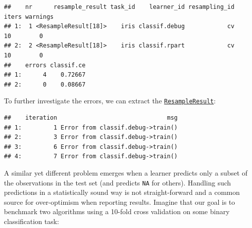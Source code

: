 \documentclass[]{scrbook}
\newenvironment{Shaded}{\begin{snugshade}}{\end{snugshade}}
\newcommand{\DataTypeTok}[1]{\textcolor[rgb]{0.13,0.29,0.53}{#1}}
\newcommand{\FloatTok}[1]{\textcolor[rgb]{0.00,0.00,0.81}{#1}}
\newcommand{\KeywordTok}[1]{\textcolor[rgb]{0.13,0.29,0.53}{\textbf{#1}}}
\newcommand{\NormalTok}[1]{#1}
\newcommand{\OperatorTok}[1]{\textcolor[rgb]{0.81,0.36,0.00}{\textbf{#1}}}
\newcommand{\OtherTok}[1]{\textcolor[rgb]{0.56,0.35,0.01}{#1}}
\newcommand{\StringTok}[1]{\textcolor[rgb]{0.31,0.60,0.02}{#1}}
\renewenvironment{Shaded} {\begin{snugshade}\small} {\end{snugshade}}
\begin{document}
\begin{Shaded}
\end{Shaded}

\begin{verbatim}
##    nr      resample_result task_id    learner_id resampling_id iters warnings
## 1:  1 <ResampleResult[18]>    iris classif.debug            cv    10        0
## 2:  2 <ResampleResult[18]>    iris classif.rpart            cv    10        0
##    errors classif.ce
## 1:      4    0.72667
## 2:      0    0.08667
\end{verbatim}

To further investigate the errors, we can extract the \href{https://mlr3.mlr-org.com/reference/ResampleResult.html}{\texttt{ResampleResult}}:

\begin{Shaded}
\end{Shaded}

\begin{verbatim}
##    iteration                               msg
## 1:         1 Error from classif.debug->train()
## 2:         3 Error from classif.debug->train()
## 3:         6 Error from classif.debug->train()
## 4:         7 Error from classif.debug->train()
\end{verbatim}

A similar yet different problem emerges when a learner predicts only a subset of the observations in the test set (and predicts \texttt{NA} for others).
Handling such predictions in a statistically sound way is not straight-forward and a common source for over-optimism when reporting results.
Imagine that our goal is to benchmark two algorithms using a 10-fold cross validation on some binary classification task:
\end{document}
